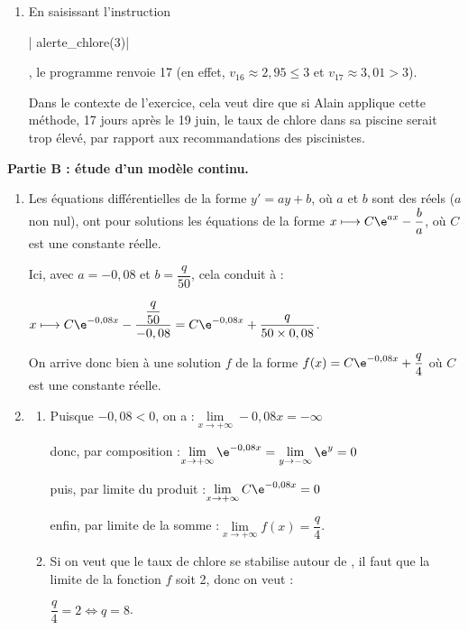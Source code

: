 \begin{enumerate}
	\item En saisissant l'instruction {\begin{Verb}| alerte_chlore(3)|\end{Verb}}, le programme renvoie 17 (en effet, $v_{16}\approx 2,95 \leqslant 3$ et $v_{17} \approx 3,01 > 3$).

Dans le contexte de l'exercice, cela veut dire que si Alain applique cette méthode, 17 jours après le 19 juin, le taux de chlore dans sa piscine serait trop élevé, par rapport aux recommandations des piscinistes.
\end{enumerate}

\medskip

\textbf{Partie B : étude d'un modèle continu.}

\smallskip

\begin{enumerate}
\item Les équations différentielles de la forme \quad$y' = ay + b$, où $a$ et $b$ sont des réels ($a$ non nul), ont pour solutions les équations de la forme \quad $x\longmapsto C\e^{ax} - \dfrac{b}{a}$, où $C$ est une constante réelle.

Ici, avec $a = -0,08$ et $b = \dfrac{q}{50}$, cela conduit à :

$x\longmapsto C\e^{-0,08x} - \dfrac{\dfrac{q}{50}}{-0,08} = C\e^{-0,08x} + \dfrac{q}{50\times 0,08}$.

On arrive donc bien à une solution $f$ de la forme $f(x)=C \e^{-0,08 x}+\dfrac{q}{4}$ où $C$ est une constante réelle.

\item
	\begin{enumerate}
		\item Puisque $-0,08<0$, on a :\quad $\lim\limits_{x \to +\infty}-0,08x = -\infty$

donc, par composition :\quad $\lim\limits_{x \to +\infty}\e^{-0,08x} = \lim\limits_{y \to -\infty} \e^y = 0$

puis, par limite du produit :\quad $ \lim\limits_{x \to +\infty}C\e^{-0,08x} = 0$

enfin, par limite de la somme :\quad $\lim\limits_{x \to +\infty}f(x) = \dfrac{q}{4}$.

		\item Si on veut que le taux de chlore se stabilise autour de , il faut que la limite de la fonction $f$ soit 2, donc on veut :

$\dfrac{q}{4} = 2 \iff q = 8$.


\end{enumerate}
\end{enumerate}
